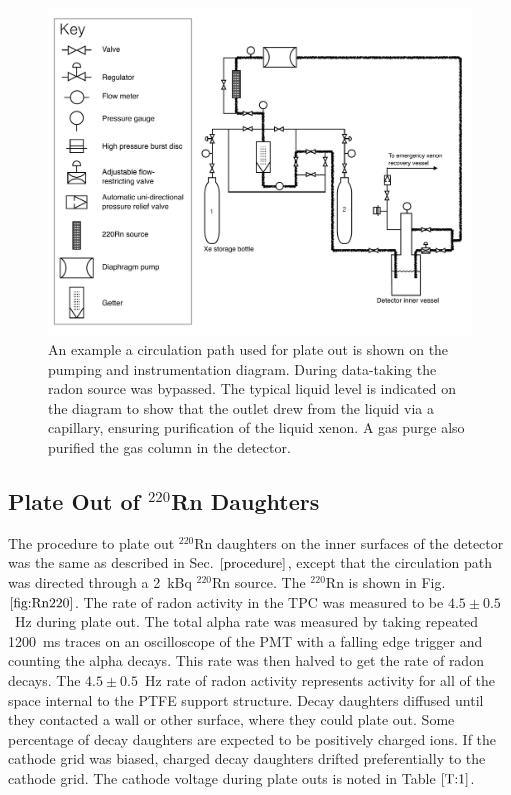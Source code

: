 \begin{figure}[ht]
    \centering
    \includegraphics[width=5.0in]{figures/radon/Rn_Circulation_Path.pdf}
    \caption{An example a circulation path used for plate out is shown on the pumping and instrumentation diagram. During data-taking the radon source was bypassed. The typical liquid level is indicated on the diagram to show that the outlet drew from the liquid via a capillary, ensuring purification of the liquid xenon. A gas purge also purified the gas column in the detector.}
    \label{fig:p_and_id}
\end{figure}

\subsection{Plate Out of $^{220}$Rn Daughters}
\label{plateout}
The procedure to plate out $^{220}$Rn daughters on the inner surfaces of the detector was the same as described in Sec. $\ref{procedure}$, except that the circulation path was directed through a 2~kBq $^{220}$Rn source. The $^{220}$Rn is shown in Fig. $\ref{fig:Rn220}$. The rate of radon activity in the TPC was measured to be $4.5\pm0.5$~Hz during plate out. The total alpha rate was measured by taking repeated 1200~ms traces on an oscilloscope of the PMT with a falling edge trigger and counting the alpha decays. This rate was then halved to get the rate of radon decays. The $4.5\pm0.5$~Hz rate of radon activity represents activity for all of the space internal to the PTFE support structure. Decay daughters diffused until they contacted a wall or other surface, where they could plate out. Some percentage of decay daughters are expected to be positively charged ions. If the cathode grid was biased, charged decay daughters drifted preferentially to the cathode grid. The cathode voltage during plate outs is noted in Table $\ref{T:1}$.

